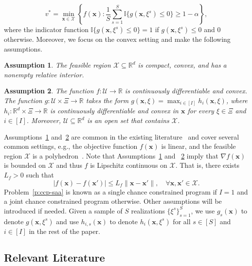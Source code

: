 \documentclass[11pt]{article}
\newtheorem{assumption}{Assumption}
\def\bs{\boldsymbol}
\def\ind{\mathbb{I}}
\def\Re{\mathbb{R}}
\def\U{\mathcal{U}}
\def\X{\mathcal{X}}
\begin{document}
\begin{equation}\label{p:ccp-saa} 
v^* = \min_{\bs x\in\X}\left\{ f(\bs x): \frac{1}{S} \sum^S_{s=1}\ind\{g(\bs x, \xi^s) \leq 0\} \geq 1 - \alpha \right\},
\end{equation}
where the indicator function $\ind\{g(\bs x, \xi^s) \leq 0\} = 1$ if $g(\bs x, \xi^s) \leq 0$ and $0$ otherwise. Moreover, we focus on the convex setting and make the following assumptions. 

\begin{assumption}\label{ass:X-convex}
The feasible region $\X\subseteq \Re^d$ is compact, convex, and has a nonempty relative interior.
\end{assumption}

\begin{assumption}\label{ass:f-g-convex}
The function $f: \U \to \Re$ is continuously differentiable and convex. The function $g:\U \times \Xi \to \Re$ takes the form $g(\bs{x}, \xi) = \max_{i \in [I]} h_i(\bs{x}, \xi)$, where $h_i : \Re^d \times \Xi \to \Re$ is continuously differentiable and convex in $\bs{x}$ for every $\xi \in \Xi$ and $i \in [I]$. Moreover, $\U \subseteq\Re^d$ is an open set that contains $\X$.
\end{assumption}

Assumptions~\ref{ass:X-convex} and~\ref{ass:f-g-convex} are common in the existing literature~\cite{wang2025proximal, jiang2022also, xie2020bicriteria, bai2021augmented} and cover several common settings, e.g., the objective function $f(\bs{x})$ is linear, and the feasible region $\X$ is a polyhedron~\cite{luedtke2010integer}. Note that Assumptions~\ref{ass:X-convex} and ~\ref{ass:f-g-convex} imply that $\nabla f(\bs{x})$ is bounded on $\X$ and thus $f$ is Lipschitz continuous on $\X$. That is, there exists $L_f > 0$ such that 
\[
|f(\bs{x}) - f(\bs{x}')| \leq L_f \|\bs{x} - \bs{x}'\|, \quad \forall \bs{x}, \bs{x}' \in \X.
\]
Problem~\eqref{p:ccp-saa} is known as a single chance constrained program if $I=1$ and a joint chance constrained program otherwise. 
Other assumptions will be introduced if needed. Given a sample of $S$ realizations $\{\xi^s\}^S_{s=1}$, we use $g_s(\bs{x})$ to denote $g(\bs{x}, \xi^s)$ and use $h_{i, s}(\bs{x})$ to denote $h_i(\bs{x}, \xi^s)$ for all $s\in[S]$ and $i \in [I]$ in the rest of the paper.

\subsection{Relevant Literature}
\end{document}
